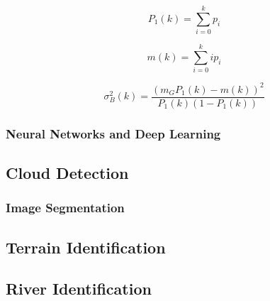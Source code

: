 \begin{equation}
P_{1}(k)=\sum_{i=0}^{k} p_{i}
\end{equation}

\begin{equation}
m(k)=\sum_{i=0}^{k} i p_{i}
\end{equation}


\begin{equation}
\sigma_{B}^{2}(k)=\frac{\left(m_{G} P_{1}(k)-m(k)\right)^{2}}{P_{1}(k)\left(1-P_{1}(k)\right)}
\end{equation}

\subsubsection{Neural Networks and Deep Learning}

\subsection{Cloud Detection}
\subsubsection{Image Segmentation}

\subsection{Terrain Identification}
\subsection{River Identification}



